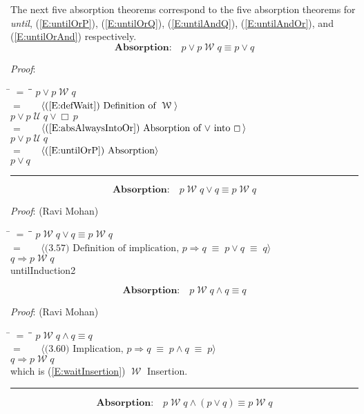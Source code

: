 \documentclass[12pt, fleqn, leqno]{article}
\newcommand{\lgap}{2pt}                             %
\newcommand{\mymathindent}{24pt}                    %
\newcommand{\equivs}{\ensuremath{\;\equiv\;}}       %
\newcommand{\impl}{\ensuremath{\Rightarrow}}        %
\newcommand{\Until}{\;\mathcal{U}\;}
\newcommand{\Wait}{\;\mathcal{W}\;}
\newcommand{\Always}{\Box\,}
\newcommand{\myqed}{\rule[-.23ex]{1.2ex}{2.0ex}}
\newcommand{\myqedtab}{\hspace{384pt}}              %
\newcommand{\Gll} {\langle}                         %
\newcommand{\Ggg} {\rangle}                         %
\newcommand{\Hint}[1]     {\ \ \ $\Gll              \mbox{#1} \Ggg$ }   %
\begin{document}
The next five absorption theorems correspond to the five absorption theorems for \textit{until},
(\ref{E:untilOrP}),
(\ref{E:untilOrQ}),
(\ref{E:untilAndQ}),
(\ref{E:untilAndOr}),
and
(\ref{E:untilOrAnd})
respectively.
\begin{equation}\label{E:waitOrP}
\textbf{Absorption:}\quad p\lor p\Wait q\equiv p\lor q
\end{equation}

\emph{Proof}:
\begin{tabbing}
\hspace{\mymathindent} \= $= \;$ \= \myqedtab \= \kill
\> \> $p\lor p\Wait q$\\[\lgap]
\> $=$ \> \Hint{(\ref{E:defWait}) Definition of $\Wait$} \\[\lgap]
\> \> $p\lor p \Until q\lor \Always p$\\[\lgap]
\> $=$ \> \Hint{(\ref{E:absAlwaysIntoOr}) Absorption of $\lor$ into $\Always$} \\[\lgap]
\> \> $p\lor p \Until q$\\[\lgap]
\> $=$ \> \Hint{(\ref{E:untilOrP}) Absorption} \\[\lgap]
\> \> $p\lor q$ \quad \myqed
\end{tabbing}
\begin{equation}\label{E:waitOrQ}
\textbf{Absorption:}\quad p\Wait q\lor q\equiv p\Wait q
\end{equation}

\emph{Proof}: (Ravi Mohan)
\begin{tabbing}
\hspace{\mymathindent} \= $= \;$ \= \myqedtab \= \kill
\> \> $p\Wait q\lor q\equiv p\Wait q$\\[\lgap]
\> $=$ \> \Hint{(3.57) Definition of implication, $p\impl q\equivs p\lor q \equivs q$} \\[\lgap]
\> \> $q\impl p\Wait q$\\[\lgap]
untilInduction2\end{tabbing}
\begin{equation}\label{E:waitAndQ}
\textbf{Absorption:}\quad p\Wait q\land q\equiv q
\end{equation}

\emph{Proof}: (Ravi Mohan)
\begin{tabbing}
\hspace{\mymathindent} \= $= \;$ \= \myqedtab \= \kill
\> \> $p\Wait q\land q\equiv q$\\[\lgap]
\> $=$  \>  \Hint{(3.60) Implication, $p\impl q \equivs p\land q \equivs p$}\\[\lgap]
\> \> $q\impl p\Wait q$\\[\lgap]
\> which is (\ref{E:waitInsertion}) $\Wait$ Insertion. \quad \myqed
\end{tabbing}
\begin{equation}\label{E:waitAndOr}
\textbf{Absorption:}\quad p\Wait q\land (p\lor q) \equiv p\Wait q
\end{equation}
\end{document}
